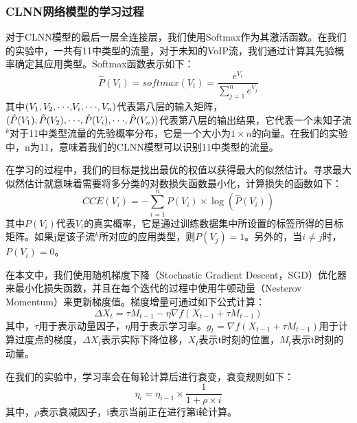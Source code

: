 \subsubsection{CLNN网络模型的学习过程}
对于CLNN模型的最后一层全连接层，我们使用Softmax作为其激活函数。在我们的实验中，一共有11中类型的流量，对于未知的VoIP流，我们通过计算其先验概率确定其应用类型。Softmax函数表示如下：
\begin{equation}
\hat P({V_i}) = softmax({V_i}) = \frac{{{e^{{V_i}}}}}{{\sum\limits_{j = 1}^n {{e^{{V_j}}}} }}
\end{equation}
其中$({V_1},{V_2},{\rm{\cdot\cdot\cdot,}}{V_i},{\rm{\cdot\cdot\cdot}},{V_n})$代表第八层的输入矩阵，$(\hat P({V_1}),\hat P({V_2}),{\rm{\cdot\cdot\cdot}},\hat P({V_i}),{\rm{\cdot\cdot\cdot}},\hat P({V_n}))$代表第八层的输出结果，它代表一个未知子流$^k$对于11中类型流量的先验概率分布，它是一个大小为$1 \times n$的向量。在我们的实验中，n为11，意味着我们的CLNN模型可以识别11中类型的流量。

在学习的过程中，我们的目标是找出最优的权值以获得最大的似然估计。寻求最大似然估计就意味着需要将多分类的对数损失函数最小化，计算损失的函数如下：
\begin{equation}
CCE({V_i}) =  - \sum\limits_{i = 1}^n {P({V_i}) \times \log (\hat P({V_i}))}
\end{equation}
其中$P({V_i})$代表${V_i}$的真实概率，它是通过训练数据集中所设置的标签所得的目标矩阵。如果j是该子流$^k$所对应的应用类型，则$P({V_j})=1$。另外的，当$i \ne j$时，$P({V_i})=0$。

在本文中，我们使用随机梯度下降（Stochastic Gradient Descent，SGD）优化器来最小化损失函数，并且在每个迭代的过程中使用牛顿动量（Nesterov Momentum）来更新梯度值。梯度增量可通过如下公式计算：
\begin{equation}
\Delta {X_t} = \tau {M_{t - 1}} - \eta \nabla f({X_{t - 1}} + \tau {M_{t - 1}})
\end{equation}
其中，${\tau}$用于表示动量因子，${\eta}$用于表示学习率。${g_t} = \nabla f({X_{t - 1}} + \tau {M_{t - 1}})$用于计算过度点的梯度，$\Delta {X_t}$表示实际下降位移，${X_t}$表示t时刻的位置，${M_t}$表示t时刻的动量。

在我们的实验中，学习率会在每轮计算后进行衰变，衰变规则如下：
\begin{equation}
\label{equ:decay}
{\eta _i} = {\eta _{i - 1}} \times \frac{1}{{1 + \rho  \times i}}
\end{equation}
其中，${\rho }$表示衰减因子，i表示当前正在进行第i轮计算。

